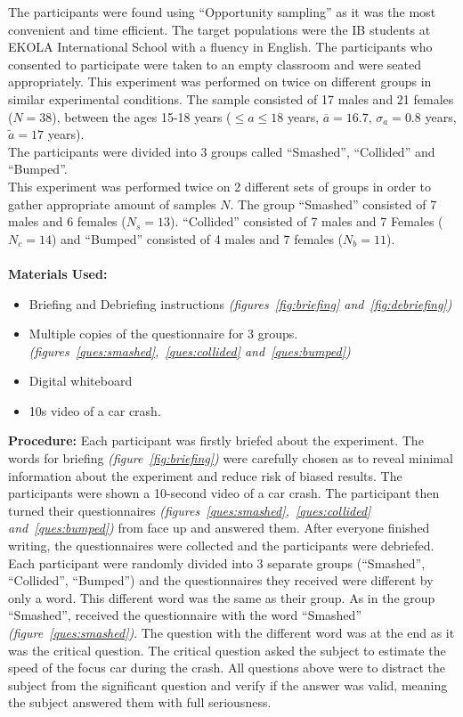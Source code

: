 \documentclass[11pt]{article}
\begin{document}
The participants were found using ``Opportunity sampling'' as it was the most convenient and time efficient. The target populations were the IB students at EKOLA International School with a fluency in English.
The participants who consented to participate were taken to an empty classroom and were seated appropriately. This experiment was performed on twice on different groups in similar experimental conditions.
The sample consisted of 17 males and 21 females ($N=38$), between the ages 15\hyphen18 years ($\leq a \leq 18$ years, $\overline{a}=16.7$, $\sigma_a=0.8$ years, $\tilde{a}=17$ years).\\
The participants were divided into 3 groups called ``Smashed'', ``Collided'' and ``Bumped''.
\\
This experiment was performed twice on 2 different sets of groups in order to gather appropriate amount of samples $N$. The group ``Smashed'' consisted of 7 males and 6 females ($N_s=13$). ``Collided'' consisted of 7 males and 7 Females ($N_c=14$) and ``Bumped'' consisted of 4 males and 7 females ($N_b=11$).\\\\
\textbf{Materials Used:}\newline
\begin{itemize}
  \item Briefing and Debriefing instructions \textit{(figures~\ref{fig:briefing} and~\ref{fig:debriefing})}
  \item Multiple copies of the questionnaire for 3 groups. \textit{(figures~\ref{ques:smashed},~\ref{ques:collided} and~\ref{ques:bumped})}
  \item Digital whiteboard
  \item 10s video of a car crash.
\end{itemize}
\textbf{Procedure:}\newline
Each participant was firstly briefed about the experiment. The words for briefing \textit{(figure~\ref{fig:briefing})} were carefully chosen as to reveal minimal information about the experiment and reduce risk of biased results. 
The participants were shown a 10-second video of a car crash. The participant then turned their questionnaires \textit{(figures~\ref{ques:smashed},~\ref{ques:collided} and~\ref{ques:bumped}) }from face up and answered them. After everyone finished writing, the questionnaires were collected
and the participants were debriefed. Each participant were randomly divided into 3 separate groups (``Smashed'', ``Collided'', ``Bumped'') and the questionnaires they received were different by only a word. This different word was the same as their group.
As in the group ``Smashed'', received the questionnaire with the word ``Smashed'' \textit{(figure~\ref{ques:smashed})}.
The question with the different word was at the end as it was the critical question. The critical question asked the subject to estimate the speed of the focus car during the crash.
All questions above were to distract the subject from the significant question and verify if the answer was valid, meaning the subject answered them with full seriousness.\\\\
\end{document}
